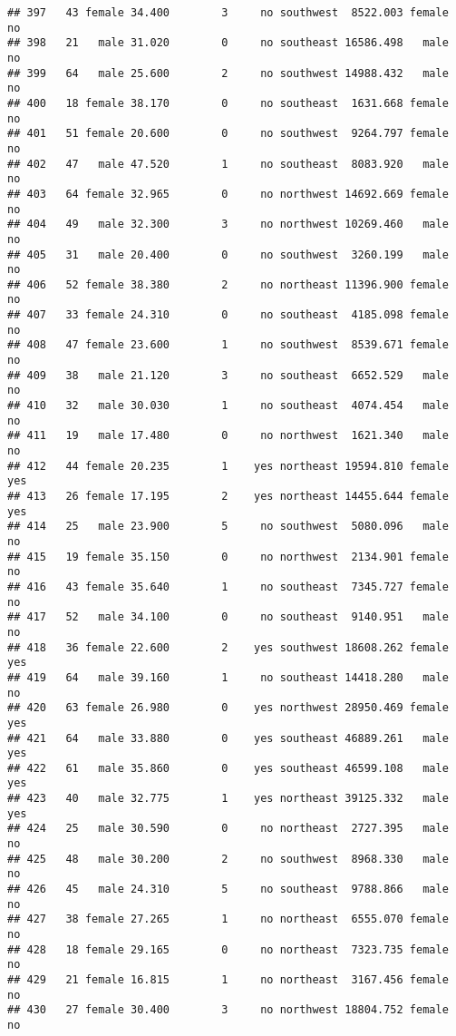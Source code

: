 \documentclass[
]{article}
\begin{document}
\begin{verbatim}
## 397   43 female 34.400        3     no southwest  8522.003 female       no
## 398   21   male 31.020        0     no southeast 16586.498   male       no
## 399   64   male 25.600        2     no southwest 14988.432   male       no
## 400   18 female 38.170        0     no southeast  1631.668 female       no
## 401   51 female 20.600        0     no southwest  9264.797 female       no
## 402   47   male 47.520        1     no southeast  8083.920   male       no
## 403   64 female 32.965        0     no northwest 14692.669 female       no
## 404   49   male 32.300        3     no northwest 10269.460   male       no
## 405   31   male 20.400        0     no southwest  3260.199   male       no
## 406   52 female 38.380        2     no northeast 11396.900 female       no
## 407   33 female 24.310        0     no southeast  4185.098 female       no
## 408   47 female 23.600        1     no southwest  8539.671 female       no
## 409   38   male 21.120        3     no southeast  6652.529   male       no
## 410   32   male 30.030        1     no southeast  4074.454   male       no
## 411   19   male 17.480        0     no northwest  1621.340   male       no
## 412   44 female 20.235        1    yes northeast 19594.810 female      yes
## 413   26 female 17.195        2    yes northeast 14455.644 female      yes
## 414   25   male 23.900        5     no southwest  5080.096   male       no
## 415   19 female 35.150        0     no northwest  2134.901 female       no
## 416   43 female 35.640        1     no southeast  7345.727 female       no
## 417   52   male 34.100        0     no southeast  9140.951   male       no
## 418   36 female 22.600        2    yes southwest 18608.262 female      yes
## 419   64   male 39.160        1     no southeast 14418.280   male       no
## 420   63 female 26.980        0    yes northwest 28950.469 female      yes
## 421   64   male 33.880        0    yes southeast 46889.261   male      yes
## 422   61   male 35.860        0    yes southeast 46599.108   male      yes
## 423   40   male 32.775        1    yes northeast 39125.332   male      yes
## 424   25   male 30.590        0     no northeast  2727.395   male       no
## 425   48   male 30.200        2     no southwest  8968.330   male       no
## 426   45   male 24.310        5     no southeast  9788.866   male       no
## 427   38 female 27.265        1     no northeast  6555.070 female       no
## 428   18 female 29.165        0     no northeast  7323.735 female       no
## 429   21 female 16.815        1     no northeast  3167.456 female       no
## 430   27 female 30.400        3     no northwest 18804.752 female       no

\end{verbatim}
\end{document}
